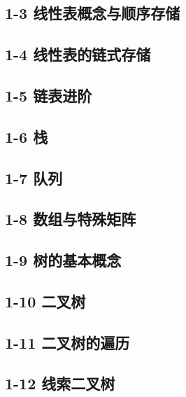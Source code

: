 \documentclass[10pt, aspectratio=169]{beamer}
\begin{document}
\subsection{1-3 线性表概念与顺序存储}


\subsection{1-4 线性表的链式存储}


\subsection{1-5 链表进阶}


\subsection{1-6 栈}


\subsection{1-7 队列}


\subsection{1-8 数组与特殊矩阵}


\subsection{1-9 树的基本概念}


\subsection{1-10 二叉树}


\subsection{1-11 二叉树的遍历}


\subsection{1-12 线索二叉树}

\end{document}
